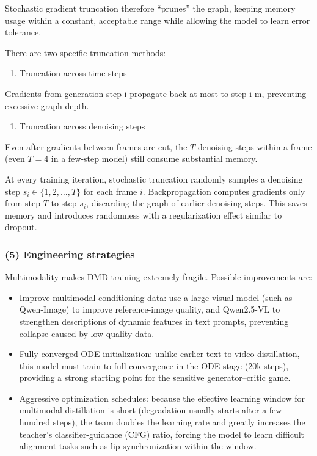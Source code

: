 Stochastic gradient truncation therefore ``prunes'' the graph, keeping memory usage within a constant, acceptable range while allowing the model to learn error tolerance.

There are two specific truncation methods:

\begin{enumerate}
\def\labelenumi{\arabic{enumi}.}
\tightlist
\item
  Truncation across time steps
\end{enumerate}

Gradients from generation step i propagate back at most to step i-m, preventing excessive graph depth.

\begin{enumerate}
\def\labelenumi{\arabic{enumi}.}
\setcounter{enumi}{1}
\tightlist
\item
  Truncation across denoising steps
\end{enumerate}

Even after gradients between frames are cut, the \(T\) denoising steps within a frame (even \(T=4\) in a few-step model) still consume substantial memory.

At every training iteration, stochastic truncation randomly samples a denoising step \(s_i\in\{1,2,\ldots,T\}\) for each frame \(i\). Backpropagation computes gradients only from step \(T\) to step \(s_i\), discarding the graph of earlier denoising steps. This saves memory and introduces randomness with a regularization effect similar to dropout.

\hypertarget{engineering-strategies}{%
\subsubsection{(5) Engineering strategies}\label{engineering-strategies}}

Multimodality makes DMD training extremely fragile. Possible improvements are:

\begin{itemize}
\tightlist
\item
  Improve multimodal conditioning data: use a large visual model (such as Qwen-Image) to improve reference-image quality, and Qwen2.5-VL to strengthen descriptions of dynamic features in text prompts, preventing collapse caused by low-quality data.
\item
  Fully converged ODE initialization: unlike earlier text-to-video distillation, this model must train to full convergence in the ODE stage (20k steps), providing a strong starting point for the sensitive generator--critic game.
\item
  Aggressive optimization schedules: because the effective learning window for multimodal distillation is short (degradation usually starts after a few hundred steps), the team doubles the learning rate and greatly increases the teacher's classifier-guidance (CFG) ratio, forcing the model to learn difficult alignment tasks such as lip synchronization within the window.
\end{itemize}

